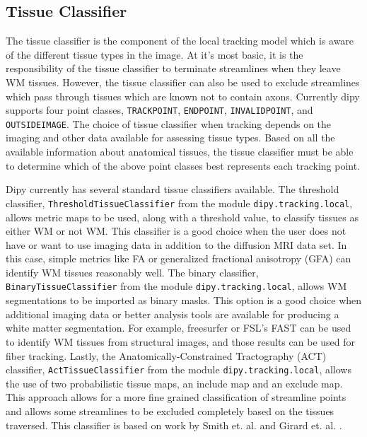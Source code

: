 \subsection{Tissue Classifier}
    The tissue classifier is the component of the local tracking model which is aware of the different tissue types in the image. At it's most basic, it is the responsibility of the tissue classifier to terminate streamlines when they leave WM tissues. However, the tissue classifier can also be used to exclude streamlines which pass through tissues which are known not to contain axons. Currently dipy supports four point classes, \texttt{TRACKPOINT}, \texttt{ENDPOINT}, \texttt{INVALIDPOINT}, and \texttt{OUTSIDEIMAGE}. The choice of tissue classifier when tracking depends on the imaging and other data available for assessing tissue types. Based on all the available information about anatomical tissues, the tissue classifier must be able to determine which of the above point classes best represents each tracking point.
    
    Dipy currently has several standard tissue classifiers available. The threshold classifier, \texttt{ThresholdTissueClassifier} from the module \texttt{dipy.tracking.local}, allows metric maps to be used, along with a threshold value, to classify tissues as either WM or not WM. This classifier is a good choice when the user does not have or want to use imaging data in addition to the diffusion MRI data set. In this case, simple metrics like FA or generalized fractional anisotropy (GFA) can identify WM tissues reasonably well. The binary classifier, \texttt{BinaryTissueClassifier} from the module \texttt{dipy.tracking.local}, allows WM segmentations to be imported as binary masks. This option is a good choice when additional imaging data or better analysis tools are available for producing a white matter segmentation. For example, freesurfer \cite{Dale_1999} or FSL's FAST \cite{Zhang_2001} can be used to identify WM tissues from structural images, and those results can be used for fiber tracking. Lastly, the Anatomically-Constrained Tractography (ACT) classifier, \texttt{ActTissueClassifier} from the module \texttt{dipy.tracking.local}, allows the use of two probabilistic tissue maps, an include map and an exclude map. This approach allows for a more fine grained classification of streamline points and allows some streamlines to be excluded completely based on the tissues traversed. This classifier is based on work by Smith et. al. \cite{Smith_2012} and Girard et. al. \cite{girard2014towards}.
    
